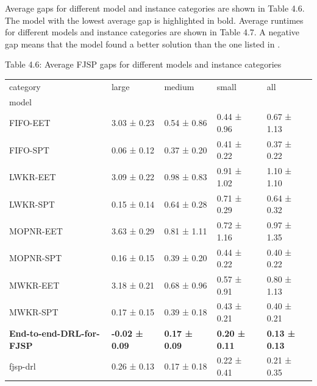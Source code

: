 Average gaps for different model and instance categories are shown in Table 4.6. The model with the lowest average gap is highlighted in bold. Average runtimes for different models and instance categories are shown in Table 4.7. A negative gap means that the model found a better solution than the one listed in \cite{fjsp_benchmarks}.

\begin{table}
    Table 4.6: Average FJSP gaps for different models and instance categories\\
    \vspace{1mm}
    \label{table:4.4}
    \footnotesize 
    \begin{tabular}{lllll}
        \toprule
        category & large & medium & small & all \\
        model &  &  &  &  \\
        \midrule
        FIFO-EET & 3.03 ± 0.23 & 0.54 ± 0.86 & 0.44 ± 0.96 & 0.67 ± 1.13 \\
        FIFO-SPT & 0.06 ± 0.12 & 0.37 ± 0.20 & 0.41 ± 0.22 & 0.37 ± 0.22 \\
        LWKR-EET & 3.09 ± 0.22 & 0.98 ± 0.83 & 0.91 ± 1.02 & 1.10 ± 1.10 \\
        LWKR-SPT & 0.15 ± 0.14 & 0.64 ± 0.28 & 0.71 ± 0.29 & 0.64 ± 0.32 \\
        MOPNR-EET & 3.63 ± 0.29 & 0.81 ± 1.11 & 0.72 ± 1.16 & 0.97 ± 1.35 \\
        MOPNR-SPT & 0.16 ± 0.15 & 0.39 ± 0.20 & 0.44 ± 0.22 & 0.40 ± 0.22 \\
        MWKR-EET & 3.18 ± 0.21 & 0.68 ± 0.96 & 0.57 ± 0.91 & 0.80 ± 1.13 \\
        MWKR-SPT & 0.17 ± 0.15 & 0.39 ± 0.18 & 0.43 ± 0.21 & 0.40 ± 0.21 \\
        \textbf{End-to-end-DRL-for-FJSP} & \textbf{-0.02 ± 0.09} & \textbf{0.17 ± 0.09} & \textbf{0.20 ± 0.11} & \textbf{0.13 ± 0.13} \\
        fjsp-drl & 0.26 ± 0.13 & 0.17 ± 0.18 & 0.22 ± 0.41 & 0.21 ± 0.35 \\
        \bottomrule
    \end{tabular}
\end{table}

